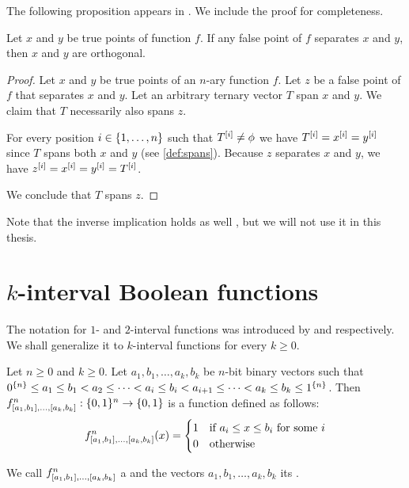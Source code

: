 The following proposition appears
in \citet[Lemma 3.7]{Cepek2012}.
We include the proof for completeness.

\begin{theorem}
\label{theorem:separatingfportho}
Let $x$ and $y$ be true points of function $f$.
If any false point of $f$ separates $x$ and $y$,
then $x$ and $y$ are orthogonal.
\end{theorem}

\begin{proof}
Let $x$ and $y$ be true points of an $n$-ary function $f$.
Let $z$ be a false point of $f$
that separates $x$ and $y$.
Let an arbitrary ternary vector $T$ span $x$ and $y$.
We claim that $T$ necessarily also spans $z$.

For every position $i \in \{1, \ldots, n\}$
such that $T^{[i]} \neq \phi$
we have $T^{[i]} = x^{[i]} = y^{[i]}$
since $T$ spans both $x$ and $y$
(see \cref{def:spans}).
Because $z$ separates $x$ and $y$,
we have
$z^{[i]} = x^{[i]} = y^{[i]} = T^{[i]}$.

We conclude that $T$ spans $z$.
\end{proof}

Note that the inverse implication holds as well
\citep[Lemma 3.7]{Cepek2012},
but we will not use it in this thesis.

\section{\texorpdfstring{$k$}{k}-interval
Boolean functions}

The notation for $1$- and $2$-interval
functions was introduced by \citeauthor{Schieber2005154}
and \citeauthor{Dubovsky2012} respectively.
We shall generalize it to $k$-interval functions
for every $k \geq 0$.

\begin{definition}
\label{def:kibf}
Let $n \geq 0$ and $k \geq 0$.
Let $a_1, b_1, \ldots, a_k, b_k$ be $n$-bit binary vectors
such that $0^{\{n\}} \leq a_1 \leq b_1 < a_2
\leq \cdots < a_i \leq b_i < a_{i+1}
\leq \cdots < a_k \leq b_k \leq 1^{\{n\}}$.
Then $f^{n}_{[a_1, b_1], \ldots, [a_{k}, b_{k}]}: \{0, 1\}{}^n \rightarrow \{0, 1\}{}$ is a function defined as follows:
$$
f^{n}_{[a_1, b_1], \ldots, [a_{k}, b_{k}]}(x) =
\begin{cases}
1 & \text{if } a_i \leq x \leq b_i \text{ for some } i \\
0 & \text{otherwise}
\end{cases}
$$

We call
$f^n_{[a_1, b_1], \ldots, [a_k, b_k]}$
a 
and the vectors $a_1, b_1, \ldots, a_k, b_k$ its
.
\end{definition}

